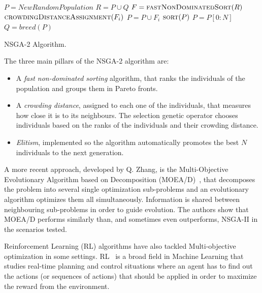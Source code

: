 \documentclass[journal]{IEEEtran}
\begin{document}
\begin{algorithm}[!t]
\begin{algorithmic}[1]
	\State $P = NewRandomPopulation$
		\State $R = P \cup Q$ 
		\State $F = \Call{fastNonDominatedSort}{R}$
			\State $\Call{crowdingDistanceAssignment}{F_i}$	
			\State $P = P \cup F_i$
		\EndWhile
		\State $\Call{sort}{P}$
		\State $P = P[0:N]$
		\State $Q = breed(P)$	
	\EndWhile
\EndFunction
\end{algorithmic}
\caption{NSGA-2 Algorithm.}
\label{alg:nsga2}
\end{algorithm}

The three main pillars of the NSGA-2 algorithm are:

\begin{itemize}
\item A \textit{fast non-dominated sorting} algorithm, that ranks the individuals of the population and groups them in Pareto fronts.
\item A \textit{crowding distance}, assigned to each one of the individuals, that measures how close it is to its neighbours. The selection genetic operator chooses individuals based on the ranks of the individuals and their crowding distance.
\item \textit{Elitism}, implemented so the algorithm automatically promotes the best $N$ individuals to the next generation.
\end{itemize}

A more recent approach, developed by Q. Zhang, is the Multi-Objective Evolutionary Algorithm based on Decomposition (MOEA/D)~\cite{Zhang2007}, that decomposes the problem into several single optimization sub-problems and an evolutionary algorithm optimizes them all simultaneously. Information is shared between neighbouring sub-problems in order to guide evolution. The authors show that MOEA/D performs similarly than, and sometimes even outperforms, NSGA-II in the scenarios tested.

Reinforcement Learning (RL) algorithms have also tackled Multi-objective optimization in some settings. RL~\cite{Sutton1998} is a broad field in Machine Learning that studies real-time planning and control situations where  an agent has to find out the actions (or sequences of actions) that should be applied in order to maximize the reward from the environment. 
\end{document}
